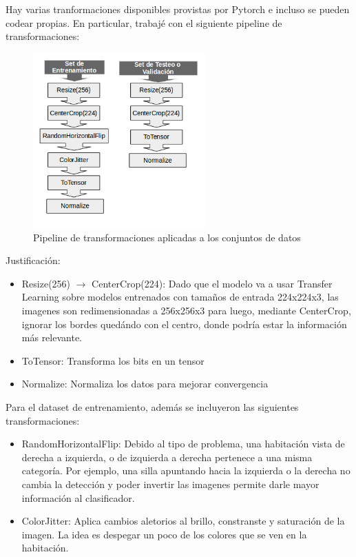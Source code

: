\documentclass{article}
\begin{document}
Hay varias tranformaciones disponibles provistas por Pytorch e incluso se pueden codear propias. En particular, trabajé con el siguiente pipeline de transformaciones:

\begin{figure}[H]
  \begin{center}
    \includegraphics[width=250px]{img/transformaciones.png}
    \caption{ Pipeline de transformaciones aplicadas a los conjuntos de datos }
    \label{conn}
  \end{center}
\end{figure}


Justificación: 

\begin{itemize}
  \item Resize(256) $\rightarrow$ CenterCrop(224): Dado que el modelo va a usar Transfer Learning sobre modelos entrenados con tamaños de entrada 224x224x3, las imagenes son redimensionadas a 256x256x3 para luego, mediante CenterCrop, ignorar los bordes quedándo con el centro, donde podría estar la información más relevante. 
  \item ToTensor: Transforma los bits en un tensor
  \item Normalize: Normaliza los datos para mejorar convergencia  
\end{itemize}

Para el dataset de entrenamiento, además se incluyeron las siguientes transformaciones:

\begin{itemize}
  \item RandomHorizontalFlip: Debido al tipo de problema, una habitación vista de derecha a izquierda, o de izquierda a derecha pertenece a una misma categoría. Por ejemplo, una silla apuntando hacia la izquierda o la derecha no cambia la detección y poder invertir las imagenes permite darle mayor información al clasificador. 
  \item ColorJitter: Aplica cambios aletorios al brillo, constranste y saturación de la imagen. La idea es despegar un poco de los colores que se ven en la habitación. 
\end{itemize}
\end{document}
